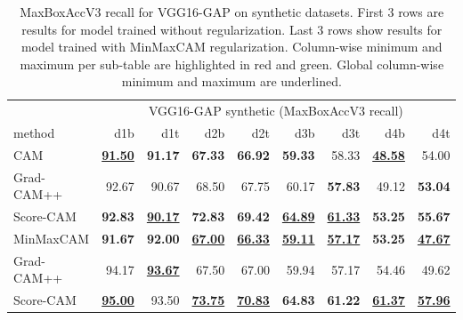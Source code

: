 \begin{table}[ht]
\centering
\begin{tabular}{lrrrrrrrr}
\toprule
& \multicolumn{8}{c}{VGG16-GAP synthetic (MaxBoxAccV3 recall)} \\
method & d1b & d1t & d2b & d2t & d3b & d3t & d4b & d4t \\
\cmidrule(lr){1-1} \cmidrule(lr){2-9} 
CAM & \color{purple} \bfseries  \underline{91.50} & \color{teal} \bfseries 91.17 & \color{purple} \bfseries 67.33 & \color{purple} \bfseries 66.92 & \color{purple} \bfseries 59.33 & 58.33 & \color{purple} \bfseries \underline{48.58} & 54.00 \\
Grad-CAM++ & 92.67 & 90.67 & 68.50 & 67.75 & 60.17 & \color{purple} \bfseries 57.83 & 49.12 & \color{purple} \bfseries 53.04 \\
Score-CAM & \color{teal} \bfseries 92.83 & \color{purple} \bfseries \underline{90.17} & \color{teal} \bfseries 72.83 & \color{teal} \bfseries 69.42 & \color{teal} \bfseries \underline{64.89} & \color{teal} \bfseries \underline{61.33} & \color{teal} \bfseries 53.25 & \color{teal} \bfseries 55.67 \\
\cmidrule(lr){1-1} \cmidrule(lr){2-9} 
MinMaxCAM & \color{purple} \bfseries 91.67 & \color{purple} \bfseries 92.00 & \color{purple} \bfseries \underline{67.00} & \color{purple} \bfseries \underline{66.33} & \color{purple} \bfseries \underline{59.11} & \color{purple} \bfseries \underline{57.17} & \color{purple} \bfseries 53.25 & \color{purple} \bfseries \underline{47.67} \\
Grad-CAM++ & 94.17 & \color{teal} \bfseries \underline{93.67} & 67.50 & 67.00 & 59.94 & 57.17 & 54.46 & 49.62 \\
Score-CAM & \color{teal} \bfseries \underline{95.00} & 93.50 & \color{teal} \bfseries \underline{73.75} & \color{teal} \bfseries \underline{70.83} & \color{teal} \bfseries 64.83 & \color{teal} \bfseries 61.22 & \color{teal} \bfseries \underline{61.37} & \color{teal} \bfseries \underline{57.96} \\
\bottomrule
\end{tabular}
\caption[MaxBoxAccV3 for VGG16-GAP on synthetic datasets]{MaxBoxAccV3 recall for VGG16-GAP on synthetic datasets. First 3 rows are results for model trained without regularization. Last 3 rows show results for model trained with MinMaxCAM regularization. Column-wise minimum and maximum per sub-table are highlighted in red and green. Global column-wise minimum and maximum are underlined.}
\label{tab:maxboxaccv3_recall_vgg16_gap_synthetic}
\end{table}

